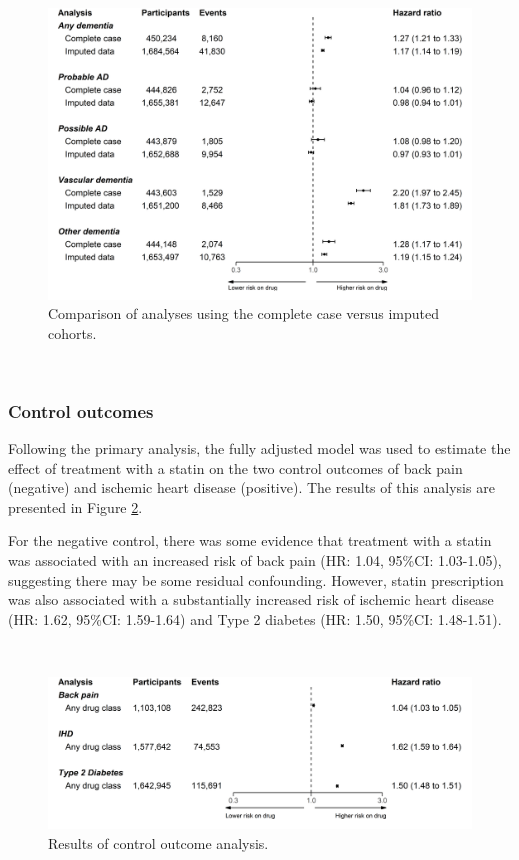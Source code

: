 \documentclass[a4paper, twoside]{templates/ociamthesis}
\begin{document}
\begin{figure}[H]
\includegraphics[width=1\linewidth]{figures/cprd-analysis/forester_complete_case} \caption[Complete case vs.~imputed data analysis]{Comparison of analyses using the complete case versus imputed cohorts.}\label{fig:completeCaseFig}
\end{figure}

~

\hypertarget{control-outcomes-1}{%
\subsubsection{Control outcomes}\label{control-outcomes-1}}

Following the primary analysis, the fully adjusted model was used to estimate the effect of treatment with a statin on the two control outcomes of back pain (negative) and ischemic heart disease (positive). The results of this analysis are presented in Figure \ref{fig:controlOutcomeFig}.

For the negative control, there was some evidence that treatment with a statin was associated with an increased risk of back pain (HR: 1.04, 95\%CI: 1.03-1.05), suggesting there may be some residual confounding. However, statin prescription was also associated with a substantially increased risk of ischemic heart disease (HR: 1.62, 95\%CI: 1.59-1.64) and Type 2 diabetes (HR: 1.50, 95\%CI: 1.48-1.51).

~





\begin{figure}[H]
\includegraphics[width=1\linewidth]{figures/cprd-analysis/forester_control_outcomes} \caption[Results of control outcome analysis]{Results of control outcome analysis.}\label{fig:controlOutcomeFig}
\end{figure}
\end{document}
